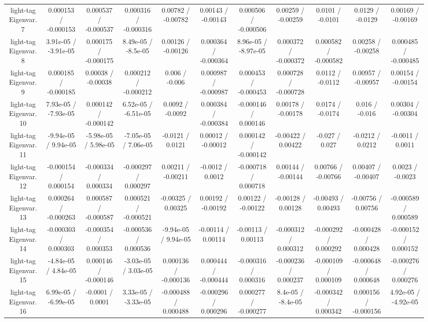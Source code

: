 {\begin{landscape}
\begin{longtable}{@{\extracolsep{\fill}}| *{11}{c|}}
  light-tag Eigenvar. 7 & 0.000153 / -0.000153 & 0.000537 / -0.000537 & 0.000316 / -0.000316 & 0.00782 / -0.00782 & 0.00143 / -0.00143 & 0.000506 / -0.000506 & 0.00259 / -0.00259 & 0.0101 / -0.0101 & 0.0129 / -0.0129 & 0.00169 / -0.00169 \\ 
  light-tag Eigenvar. 8 & 3.91e-05 / -3.91e-05 & 0.000175 / -0.000175 & 8.49e-05 / -8.5e-05 & 0.00126 / -0.00126 & 0.000364 / -0.000364 & 8.96e-05 / -8.97e-05 & 0.000372 / -0.000372 & 0.000582 / -0.000582 & 0.00258 / -0.00258 & 0.000485 / -0.000485 \\ 
  light-tag Eigenvar. 9 & 0.000185 / -0.000185 & 0.00038 / -0.00038 & 0.000212 / -0.000212 & 0.006 / -0.006 & 0.000987 / -0.000987 & 0.000453 / -0.000453 & 0.000728 / -0.000728 & 0.0112 / -0.0112 & 0.00957 / -0.00957 & 0.00154 / -0.00154 \\ 
  light-tag Eigenvar. 10 & 7.93e-05 / -7.93e-05 & 0.000142 / -0.000142 & 6.52e-05 / -6.51e-05 & 0.0092 / -0.0092 & 0.000384 / -0.000384 & -0.000146 / 0.000146 & 0.00178 / -0.00178 & 0.0174 / -0.0174 & 0.016 / -0.016 & 0.00304 / -0.00304 \\ 
  light-tag Eigenvar. 11 & -9.94e-05 / 9.94e-05 & -5.98e-05 / 5.98e-05 & -7.05e-05 / 7.06e-05 & -0.0121 / 0.0121 & 0.00012 / -0.00012 & 0.000142 / -0.000142 & -0.00422 / 0.00422 & -0.027 / 0.027 & -0.0212 / 0.0212 & -0.0011 / 0.0011 \\ 
  light-tag Eigenvar. 12 & -0.000154 / 0.000154 & -0.000334 / 0.000334 & -0.000297 / 0.000297 & 0.00211 / -0.00211 & -0.0012 / 0.0012 & -0.000718 / 0.000718 & 0.00144 / -0.00144 & 0.00766 / -0.00766 & 0.00407 / -0.00407 & 0.0023 / -0.0023 \\ 
  light-tag Eigenvar. 13 & 0.000264 / -0.000263 & 0.000587 / -0.000587 & 0.000521 / -0.000521 & -0.00325 / 0.00325 & 0.00192 / -0.00192 & 0.00122 / -0.00122 & -0.00128 / 0.00128 & -0.00493 / 0.00493 & -0.00756 / 0.00756 & -0.000589 / 0.000589 \\ 
  light-tag Eigenvar. 14 & -0.000303 / 0.000303 & -0.000354 / 0.000353 & -0.000536 / 0.000536 & -9.94e-05 / 9.94e-05 & -0.00114 / 0.00114 & -0.00113 / 0.00113 & -0.000312 / 0.000312 & -0.000292 / 0.000292 & -0.000428 / 0.000428 & -0.000152 / 0.000152 \\ 
  light-tag Eigenvar. 15 & -4.84e-05 / 4.84e-05 & 0.000146 / -0.000146 & -3.03e-05 / 3.03e-05 & 0.000136 / -0.000136 & 0.000444 / -0.000444 & -0.000316 / 0.000316 & -0.000236 / 0.000237 & -0.000109 / 0.000109 & -0.000648 / 0.000648 & -0.000276 / 0.000276 \\ 
  light-tag Eigenvar. 16 & 6.99e-05 / -6.99e-05 & -0.0001 / 0.0001 & 3.33e-05 / -3.33e-05 & -0.000488 / 0.000488 & -0.000296 / 0.000296 & 0.000277 / -0.000277 & 8.4e-05 / -8.4e-05 & -0.000342 / 0.000342 & 0.000156 / -0.000156 & 4.92e-05 / -4.92e-05 \\ 

\end{longtable}
\end{landscape}}
